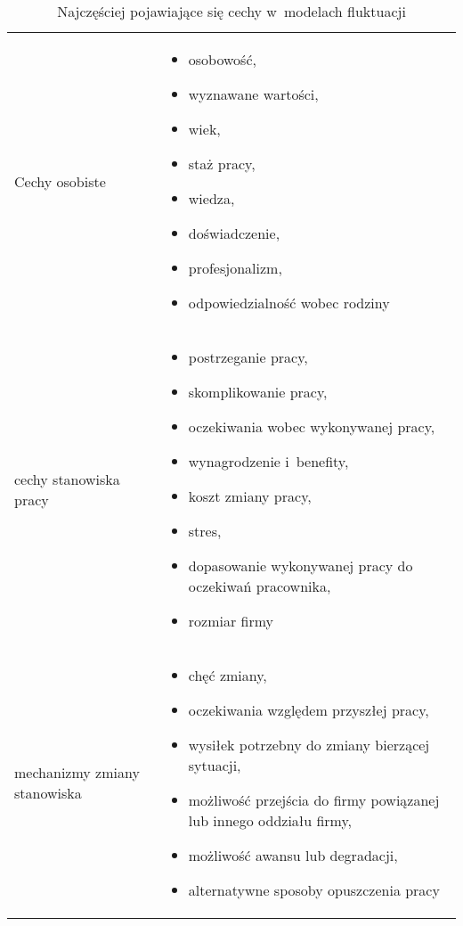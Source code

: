 \noindent
\begin{table}
    \raggedright\caption{Najczęściej pojawiające się cechy w~modelach fluktuacji\label{tabela:fluktuacja-cechy}}
    \begin{center}
        \begin{tabular}{|P{.2\textwidth}|p{.7\textwidth}|}

            \hline
             &
             \\
            \hline

            Cechy osobiste &
            \begin{itemize}
                \item osobowość,
                \item wyznawane wartości,
                \item wiek,
                \item staż pracy,
                \item wiedza,
                \item doświadczenie,
                \item profesjonalizm,
                \item odpowiedzialność wobec rodziny
            \end{itemize} \\

            \hline

            cechy stanowiska pracy &
            \begin{itemize}
                \item postrzeganie pracy,
                \item skomplikowanie pracy,
                \item oczekiwania wobec wykonywanej pracy,
                \item wynagrodzenie i~benefity,
                \item koszt zmiany pracy,
                \item stres,
                \item dopasowanie wykonywanej pracy do oczekiwań pracownika,
                \item rozmiar firmy
            \end{itemize} \\
            \hline

            mechanizmy zmiany stanowiska &
            \begin{itemize}
                \item chęć zmiany,
                \item oczekiwania względem przyszłej pracy,
                \item wysiłek potrzebny do zmiany bierzącej sytuacji,
                \item możliwość przejścia do firmy powiązanej lub innego oddziału firmy,
                \item możliwość awansu lub degradacji,
                \item alternatywne sposoby opuszczenia pracy
            \end{itemize} \\
            \hline


\end{tabular}
\end{center}
\end{table}

